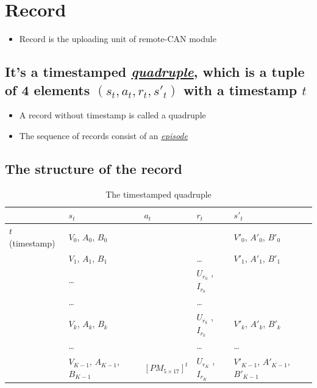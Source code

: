 \documentclass[a4paper, 11pt]{article}
\begin{document}
\section{Record}
\label{sec:orgf66f1ee}
\begin{itemize}
\item Record is the uploading unit of remote-CAN module
\end{itemize}
\subsection{It's a timestamped \hyperref[quadruple]{\emph{quadruple}}, which is a tuple of 4 elements \((s_t, a_t, r_t, s'_t)\) with a timestamp \(t\)}
\label{sec:org1c9809d}
\begin{itemize}
\item A record without timestamp is called a quadruple\label{quadruple}
\item The sequence of records consist of an \hyperref[sec:org22c469d]{\emph{episode}}
\end{itemize}
\subsection{The structure of the record}
\label{sec:org7a93331}

\begin{table}[htbp]
\caption[Record]{The timestamped quadruple}
\centering
\begin{tabular}{lllll}
 & \(s_t\) & \(a_t\) & \(r_t\) & \(s'_t\)\\
\hline
\(t\) (timestamp) & \(V_0\), \(A_0\), \(B_0\) &  &  & \(V'_0\), \(A'_0\), \(B'_0\)\\
 & \(V_1\), \(A_1\), \(B_1\) &  & \ldots{} & \(V'_1\), \(A'_1\), \(B'_1\)\\
 & \ldots{} &  & \(U_{r_0}\) , \(I_{r_0}\) & \\
 & \ldots{} &  & \ldots{} & \\
 & \(V_k\), \(A_k\), \(B_k\) &  & \(U_{r_k}\) , \(I_{r_k}\) & \(V'_k\), \(A'_k\), \(B'_k\)\\
 & \ldots{} &  & \ldots{} & \ldots{}\\
 & \(V_{K-1}\), \(A_{K-1}\), \(B_{K-1}\) & \([PM_{5\times17}]^t\) & \(U_{r_K}\) , \(I_{r_K}\) & \(V'_{K-1}\), \(A'_{K-1}\), \(B'_{K-1}\)\\
\end{tabular}
\end{table}
\end{document}
